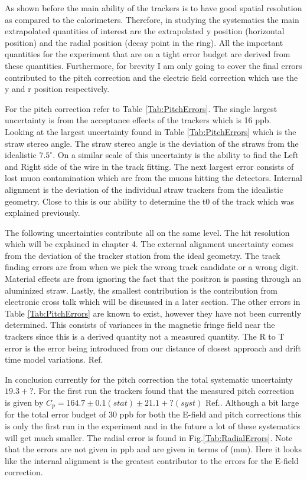 \documentclass[./Thesis]{subfiles}
\begin{document}
	As shown before the main ability of the trackers is to have good spatial resolution as compared to the calorimeters.  Therefore, in studying the systematics the main extrapolated quantities of interest are the extrapolated y position (horizontal position) and the radial position (decay point in the ring).  All the important quantities for the experiment that are on a tight error budget are derived from these quantities.  Furthermore, for brevity I am only going to cover the final errors contributed to the pitch correction and the electric field correction which use the y and r position respectively. 

	For the pitch correction refer to Table \ref{Tab:PitchErrors}. The single largest uncertainty is from the acceptance effects of the trackers which is 16 ppb. Looking at the largest uncertainty found in Table \ref{Tab:PitchErrors} which is the straw stereo angle.  The straw stereo angle is the deviation of the straws from the idealistic $7.5^\circ$.  On a similar scale of this uncertainty is the ability to find the Left and Right side of the wire in the track fitting.  The next largest error consists of lost muon contamination which are from the muons hitting the detectors.  Internal alignment is the deviation of the individual straw trackers from the idealistic geometry.  Close to this is our ability to determine the t0 of the track which was explained previously. 

	 The following uncertainties contribute all on the same level.  The hit resolution which will be explained in chapter 4.  The external alignment uncertainty comes from the deviation of the tracker station from the ideal geometry.  The track finding errors are from when we pick the wrong track candidate or a wrong digit.  Material effects are from ignoring the fact that the positron is passing through an aluminized straw.  Lastly, the smallest contribution is the contribution from electronic cross talk which will be discussed in a later section.  The other errors in Table \ref{Tab:PitchErrors} are known to exist, however they have not been currently determined.  This consists of variances in the magnetic fringe field near the trackers since this is a derived quantity not a measured quantity.  The R to T error is the error being introduced from our distance of closest approach and drift time model variations. Ref.\cite{jMottpitch}
	
		In conclusion currently for the pitch correction the total systematic uncertainty $19.3+?$.  For the first run the trackers found that the measured pitch correction is given by $C_p=164.7\pm0.1(stat)\pm21.1+?(syst)$ Ref.\cite{jMottpitch}. Although a bit large for the total error budget of 30 ppb for both the E-field and pitch corrections this is only the first run in the experiment and in the future a lot of these systematics will get much smaller. The radial error is found in Fig.\ref{Tab:RadialErrors}.  Note that the errors are not given in ppb and are given in terms of (mm).  Here it looks like the internal alignment is the greatest contributor to the errors for the E-field correction.
	
\end{document}
